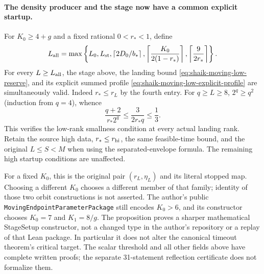 \documentclass[11pt]{article}
\theoremstyle{remark}\newtheorem{remark}[proposition]{Remark}
\begin{document}
\paragraph{The density producer and the stage now have a common explicit startup.}
For \(K_0\ge4+g\) and a fixed rational \(0<r_*<1\), define
\begin{equation}\label{eq:shaik-common-moving-startup}
 L_{\rm all}=\max\left\{L_0,L_{\rm st},
 \left\lceil2D_0/b_*\right\rceil,
 \left\lceil\frac{K_0}{2(1-r_*)}\right\rceil,
 \left\lceil\frac9{2r_*}\right\rceil\right\}.
\end{equation}
For every \(L\ge L_{\rm all}\), the stage above, the landing bound
\eqref{eq:shaik-moving-low-reserve}, and its explicit summed profile
\eqref{eq:shaik-moving-low-explicit-profile} are simultaneously valid.
Indeed \(r_*\le r_L\) by the fourth entry. For \(q\ge L\ge8\),
\(2^q\ge q^2\) (induction from \(q=4\)), whence
\[
 \frac{q+2}{r_*2^q}
 \le\frac{3}{2r_*q}\le\frac13.
\]
This verifies the low-rank smallness condition at every actual
landing rank. Retain the source high data, \(r_*\le r_{\rm hi}\),
the same feasible-time bound, and the original \(L\le S<M\)
when using the separated-envelope formula. The remaining high
startup conditions are unaffected.

For a fixed \(K_0\), this is the original pair \((r_L,\eta_L)\)
and its literal stopped map. Choosing a different \(K_0\) chooses
a different member of that family; identity of those two orbit
constructions is not asserted. The author's public
\texttt{MovingEndpointParameterPackage} still encodes
\(K_0>6\), and its constructor chooses \(K_0=7\) and \(K_1=8/g\).
The proposition proves a sharper mathematical StageSetup constructor,
not a changed type in the author's repository or a replay of that
Lean package. In particular it does not alter the canonical
timeout theorem's critical target. The scalar threshold and all
other fields above have complete written proofs; the separate
31-statement reflection certificate does not formalize them.
\end{document}
